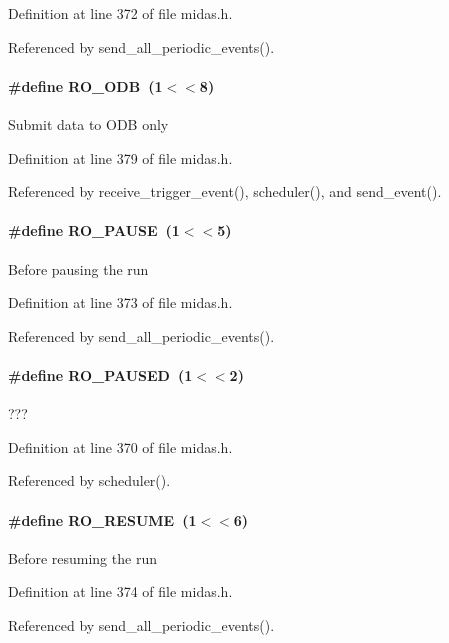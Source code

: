 Definition at line 372 of file midas.h.

Referenced by send\_\-all\_\-periodic\_\-events().
\paragraph[{RO\_\-ODB}]{\setlength{\rightskip}{0pt plus 5cm}\#define RO\_\-ODB~(1$<$$<$8)}\hfill\label{group__mdefineh_ga2de85e3b635c54456698533ebfc5635d}
Submit data to ODB only 

Definition at line 379 of file midas.h.

Referenced by receive\_\-trigger\_\-event(), scheduler(), and send\_\-event().
\paragraph[{RO\_\-PAUSE}]{\setlength{\rightskip}{0pt plus 5cm}\#define RO\_\-PAUSE~(1$<$$<$5)}\hfill\label{group__mdefineh_ga55beb931c834300fea83d24014f235d8}
Before pausing the run 

Definition at line 373 of file midas.h.

Referenced by send\_\-all\_\-periodic\_\-events().
\paragraph[{RO\_\-PAUSED}]{\setlength{\rightskip}{0pt plus 5cm}\#define RO\_\-PAUSED~(1$<$$<$2)}\hfill\label{group__mdefineh_ga8a47b3b86a72a7db84a582277d4b7a39}
??? 

Definition at line 370 of file midas.h.

Referenced by scheduler().
\paragraph[{RO\_\-RESUME}]{\setlength{\rightskip}{0pt plus 5cm}\#define RO\_\-RESUME~(1$<$$<$6)}\hfill\label{group__mdefineh_ga549159f6ef3ef7c17261bcccecbe57ec}
Before resuming the run 

Definition at line 374 of file midas.h.

Referenced by send\_\-all\_\-periodic\_\-events().
